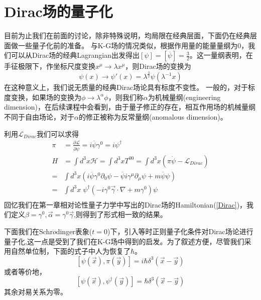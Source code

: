 \section{Dirac场的量子化}
目前为止我们在前面的讨论，除非特殊说明，均局限在经典层面，下面仍在经典层面做一些量子化前的准备。
与K-G场的情况类似，根据作用量的能量量纲为0，我们可以从Dirac场的经典Lagrangian出发得出$[\psi]=[\overline{\psi}]=\frac{3}{2}$。这一量纲表明，在手征极限下，作坐标尺度变换$x^{\mu}\longrightarrow \lambda x^{\mu}$，则Dirac场的变换为
\begin{equation}
    \psi(x) \longrightarrow \psi'(x)=\lambda^{\frac{3}{2}}\psi(\lambda^{-1} x)
\end{equation}
在这种意义上，我们说无质量的经典Dirac场论具有标度不变性。
一般的，对于标度变换，如果场的变换为$\phi\longrightarrow\lambda^{\alpha}\phi$，则我们称$\alpha$为机械量纲(engineering dimension)，在后续课程中会看到，由于量子修正的存在，相互作用场的机械量纲不同于自由场论，对于$\alpha$的修正被称为反常量纲(anomalous dimension)。

利用$\mathcal{L}_{Dirac}$我们可以求得
\begin{equation}
\begin{aligned}
    \pi&=\frac{\partial\mathcal{L}}{\partial\dot{\psi}}=i\overline{\psi}\gamma^{0}=i\psi^{\dagger}\\
    H&=\int d^{3}x\mathcal{H}=\int d^{3}xT^{00}=\int d^{3}x\left(\pi\dot{\psi}-\mathcal{L}_{Dirac}\right)\\
    =&\int d^{3}x\left(i\overline{\psi}\gamma^{0}\partial_{0}\psi-\overline{\psi}i\gamma^{\mu}\partial_{\mu}\psi+m\overline{\psi}\psi\right)\\
    =&\int d^{3}x \;\psi^{\dagger}\left(-i\gamma^{0}\vec{\gamma}\cdot\nabla+m\gamma^{0} \right)\psi\\
    \end{aligned}
\end{equation}
回忆我们在第一章相对论性量子力学中写出的Dirac场的Hamiltonian(\ref{Dirac})，我们定义$\beta=\gamma^{0},\vec{\alpha}=\gamma^{0} \vec{\gamma}$,则得到了形式相一致的结果。

下面我们在Schr$\ddot{o}$dinger表象($t=0$)下，引入等时正则量子化条件对Dirac场论进行量子化,这一点是受到了我们在K-G场中得到的启发。为了叙述方便，尽管我们采用自然单位制，下面的式子中人为恢复了$\hbar$。
\begin{equation}
\label{chap4diracquantum}
    \left[\psi(\vec{x}),\pi(\vec{y})\right]=i\hbar\delta^{3}(\vec{x}-\vec{y})
\end{equation}
或者等价地，
\begin{equation}
    \left[\psi(\vec{x}),\psi^{\dagger}(\vec{y})\right]=\hbar\delta^{3}(\vec{x}-\vec{y})
\end{equation}
其余对易关系为零。

